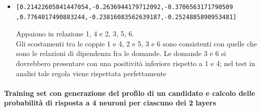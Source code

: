 \begin{itemize}
\item \begin{verbatim}[0.21422605841447054,-0.2636944179712092,-0.3706563171790509
,0.7764017490883244,-0.23816083562639187,-0.2524885890953481]\end{verbatim}
Appaiono in relazione 1, 4 e 2, 3, 5, 6.\\
Gli scostamenti tra le coppie  1  e 4, 2 e 5, 3 e 6 sono consistenti con quelle che sono le relazioni di dipendenza fra le domande.
Le domande 3 e 6 si dovrebbero presentare con una positivit\`a inferiore rispetto a 1 e 4; nel test in analisi tale regola viene rispettata perfettamente
\end{itemize}


\paragraph{Training set con generazione del profilo di un candidato e calcolo delle probabilit\`a di risposta a 4 neuroni per ciascuno dei 2 layers}\mbox{}
\label{Training set con generazione del profilo di un candidato e calcolo delle probabilita di risposta a 4 neuroni per ciascuno dei 2 layers}
\\
\noindent
